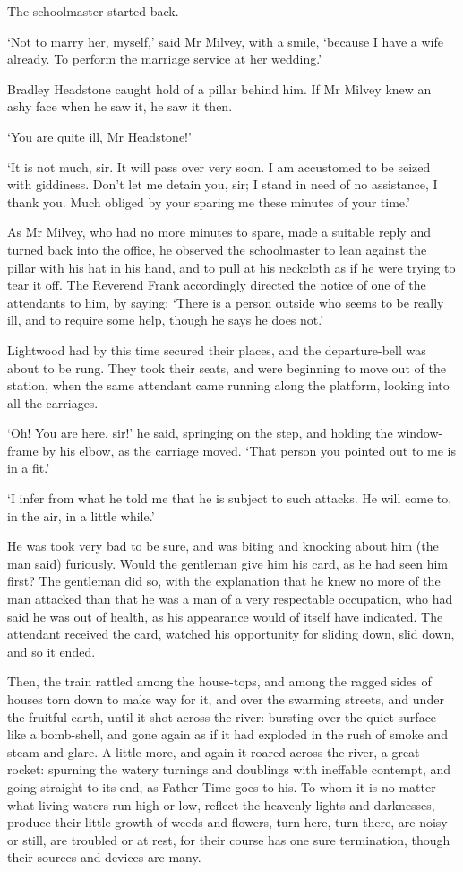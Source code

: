 The schoolmaster started back.

‘Not to marry her, myself,’ said Mr Milvey, with a smile, ‘because I
have a wife already. To perform the marriage service at her wedding.’

Bradley Headstone caught hold of a pillar behind him. If Mr Milvey knew
an ashy face when he saw it, he saw it then.

‘You are quite ill, Mr Headstone!’

‘It is not much, sir. It will pass over very soon. I am accustomed to be
seized with giddiness. Don’t let me detain you, sir; I stand in need
of no assistance, I thank you. Much obliged by your sparing me these
minutes of your time.’

As Mr Milvey, who had no more minutes to spare, made a suitable reply
and turned back into the office, he observed the schoolmaster to
lean against the pillar with his hat in his hand, and to pull at his
neckcloth as if he were trying to tear it off. The Reverend Frank
accordingly directed the notice of one of the attendants to him, by
saying: ‘There is a person outside who seems to be really ill, and to
require some help, though he says he does not.’

Lightwood had by this time secured their places, and the departure-bell
was about to be rung. They took their seats, and were beginning to
move out of the station, when the same attendant came running along the
platform, looking into all the carriages.

‘Oh! You are here, sir!’ he said, springing on the step, and holding
the window-frame by his elbow, as the carriage moved. ‘That person you
pointed out to me is in a fit.’

‘I infer from what he told me that he is subject to such attacks. He
will come to, in the air, in a little while.’

He was took very bad to be sure, and was biting and knocking about him
(the man said) furiously. Would the gentleman give him his card, as he
had seen him first? The gentleman did so, with the explanation that
he knew no more of the man attacked than that he was a man of a very
respectable occupation, who had said he was out of health, as his
appearance would of itself have indicated. The attendant received the
card, watched his opportunity for sliding down, slid down, and so it
ended.

Then, the train rattled among the house-tops, and among the ragged sides
of houses torn down to make way for it, and over the swarming streets,
and under the fruitful earth, until it shot across the river: bursting
over the quiet surface like a bomb-shell, and gone again as if it had
exploded in the rush of smoke and steam and glare. A little more, and
again it roared across the river, a great rocket: spurning the watery
turnings and doublings with ineffable contempt, and going straight to
its end, as Father Time goes to his. To whom it is no matter what living
waters run high or low, reflect the heavenly lights and darknesses,
produce their little growth of weeds and flowers, turn here, turn there,
are noisy or still, are troubled or at rest, for their course has one
sure termination, though their sources and devices are many.

